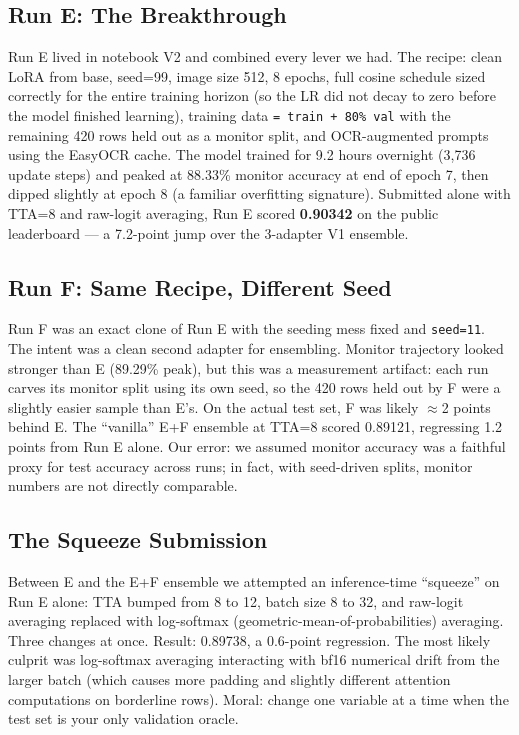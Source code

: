 \documentclass[11pt]{article}
\begin{document}
\subsection{Run E: The Breakthrough}
Run E lived in notebook V2 and combined every lever we had. The recipe: clean LoRA from base, seed=99, image size 512, 8 epochs, full cosine schedule sized correctly for the entire training horizon (so the LR did not decay to zero before the model finished learning), training data \texttt{= train + 80\% val} with the remaining 420 rows held out as a monitor split, and OCR-augmented prompts using the EasyOCR cache. The model trained for 9.2 hours overnight (3{,}736 update steps) and peaked at 88.33\% monitor accuracy at end of epoch 7, then dipped slightly at epoch 8 (a familiar overfitting signature). Submitted alone with TTA=8 and raw-logit averaging, Run E scored \textbf{0.90342} on the public leaderboard --- a 7.2-point jump over the 3-adapter V1 ensemble.

\subsection{Run F: Same Recipe, Different Seed}
Run F was an exact clone of Run E with the seeding mess fixed and \texttt{seed=11}. The intent was a clean second adapter for ensembling. Monitor trajectory looked stronger than E (89.29\% peak), but this was a measurement artifact: each run carves its monitor split using its own seed, so the 420 rows held out by F were a slightly easier sample than E's. On the actual test set, F was likely $\approx$2 points behind E. The ``vanilla'' E+F ensemble at TTA=8 scored 0.89121, regressing 1.2 points from Run E alone. Our error: we assumed monitor accuracy was a faithful proxy for test accuracy across runs; in fact, with seed-driven splits, monitor numbers are not directly comparable.

\subsection{The Squeeze Submission}
Between E and the E+F ensemble we attempted an inference-time ``squeeze'' on Run E alone: TTA bumped from 8 to 12, batch size 8 to 32, and raw-logit averaging replaced with log-softmax (geometric-mean-of-probabilities) averaging. Three changes at once. Result: 0.89738, a 0.6-point regression. The most likely culprit was log-softmax averaging interacting with bf16 numerical drift from the larger batch (which causes more padding and slightly different attention computations on borderline rows). Moral: change one variable at a time when the test set is your only validation oracle.
\end{document}
